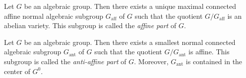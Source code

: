\begin{theorem}\label{thm:Chavellaye_decomposition}
        Let \(G\) be an algebraic group.
        Then there exists a unique maximal connected affine normal algebraic subgroup \(G_{\text{aff}}\) of \(G\) such that the quotient \(G/G_{\text{aff}}\) is an abelian variety.
        This subgroup is called the \emph{affine part} of \(G\).
    \end{theorem}

    \begin{theorem}\label{thm:Rosenlicht_decomposition}
        Let \(G\) be an algebraic group.
        Then there exists a smallest normal connected algebraic subgroup \(G_{\text{ant}}\) of \(G\) such that the quotient \(G/G_{\text{ant}}\) is affine.
        This subgroup is called the \emph{anti-affine part} of \(G\).
        Moreover, \(G_{\text{ant}}\) is contained in the center of \(G^0\).
    \end{theorem}

\subsection{}

